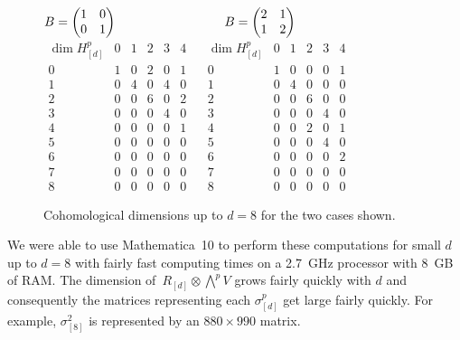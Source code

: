 \documentclass[pdftex]{sigma}
\numberwithin{equation}{section}
\begin{document}
\begin{figure}[t]\centering
$B=\begin{pmatrix}1 & 0 \\ 0 & 1\end{pmatrix}\hspace{30mm} B=\begin{pmatrix}2 & 1 \\ 1 & 2\end{pmatrix}$\vspace{1mm}\\
$\begin{array}{c|ccccc}
\dim H_{[d]}^p & 0 & 1 & 2 & 3 & 4 \\ \hline
0 & 1 & 0 & 2 & 0 & 1 \\
1 & 0 & 4 & 0 & 4 & 0 \\
2 & 0 & 0 & 6 & 0 & 2 \\
3 & 0 & 0 & 0 & 4 & 0 \\
4 & 0 & 0 & 0 & 0 & 1 \\
5 & 0 & 0 & 0 & 0 & 0 \\
6 & 0 & 0 & 0 & 0 & 0 \\
7 & 0 & 0 & 0 & 0 & 0 \\
8 & 0 & 0 & 0 & 0 & 0
\end{array}\ \ \ \
\begin{array}{c|ccccc}
\dim H_{[d]}^p & 0 & 1 & 2 & 3 & 4 \\ \hline
0 & 1 & 0 & 0 & 0 & 1 \\
1 & 0 & 4 & 0 & 0 & 0 \\
2 & 0 & 0 & 6 & 0 & 0 \\
3 & 0 & 0 & 0 & 4 & 0 \\
4 & 0 & 0 & 2 & 0 & 1 \\
5 & 0 & 0 & 0 & 4 & 0 \\
6 & 0 & 0 & 0 & 0 & 2 \\
7 & 0 & 0 & 0 & 0 & 0 \\
8 & 0 & 0 & 0 & 0 & 0
\end{array}$
\caption{\label{table1_results}Cohomological dimensions up to $d=8$ for the two cases shown.}
\end{figure}

We were able to use Mathematica~10 to perform these computations for small $d$ up to $d=8$ with fairly fast computing times on a 2.7~GHz processor with 8~GB of RAM. The dimension of~$R_{[d]}\otimes \bigwedge^p V$ grows fairly quickly with $d$ and consequently the matrices representing each $\sigma^p_{[d]}$ get large fairly quickly. For example, $\sigma^2_{[8]}$ is represented by an $880\times 990$ matrix.
\end{document}
